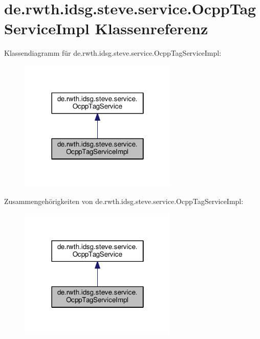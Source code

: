 \hypertarget{classde_1_1rwth_1_1idsg_1_1steve_1_1service_1_1_ocpp_tag_service_impl}{\section{de.\+rwth.\+idsg.\+steve.\+service.\+Ocpp\+Tag\+Service\+Impl Klassenreferenz}
\label{classde_1_1rwth_1_1idsg_1_1steve_1_1service_1_1_ocpp_tag_service_impl}
}


Klassendiagramm für de.\+rwth.\+idsg.\+steve.\+service.\+Ocpp\+Tag\+Service\+Impl\+:\nopagebreak
\begin{figure}[H]
\begin{center}
\leavevmode
\includegraphics[width=214pt]{classde_1_1rwth_1_1idsg_1_1steve_1_1service_1_1_ocpp_tag_service_impl__inherit__graph}
\end{center}
\end{figure}


Zusammengehörigkeiten von de.\+rwth.\+idsg.\+steve.\+service.\+Ocpp\+Tag\+Service\+Impl\+:\nopagebreak
\begin{figure}[H]
\begin{center}
\leavevmode
\includegraphics[width=214pt]{classde_1_1rwth_1_1idsg_1_1steve_1_1service_1_1_ocpp_tag_service_impl__coll__graph}
\end{center}
\end{figure}
